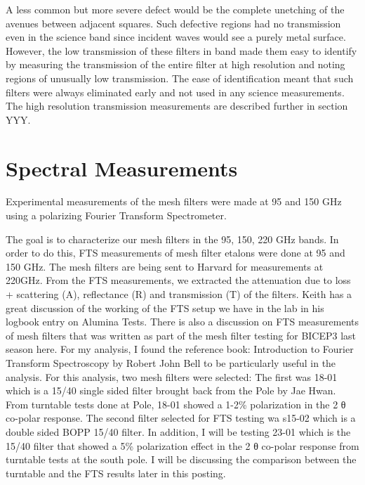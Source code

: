 \documentclass[12pt]{article}
\begin{document}
A less common but more severe defect would be the complete unetching of the avenues between adjacent squares. Such defective regions had no transmission even in the science band since incident waves would see a purely metal surface. However, the low transmission of these filters in band made them easy to identify by measuring the transmission of the entire filter at high resolution and noting regions of unusually low transmission. The ease of identification meant that such filters were always eliminated early and not used in any science measurements. The high resolution transmission measurements are described further in section YYY.


\section{Spectral Measurements}
Experimental measurements of the mesh filters were made at 95 and 150 GHz using a polarizing Fourier Transform Spectrometer. 

The goal is to characterize our mesh filters in the 95, 150, 220 GHz bands. In order to do this, FTS measurements of mesh filter etalons were done at 95 and 150 GHz. The mesh filters are being sent to Harvard for measurements at 220GHz. From the FTS measurements, we extracted the attenuation due to loss + scattering (A), reflectance (R) and transmission (T) of the filters. Keith has a great discussion of the working of the FTS setup we have in the lab in his logbook entry on Alumina Tests. There is also a discussion on FTS measurements of mesh filters that was written as part of the mesh filter testing for BICEP3 last season here. For my analysis, I found the reference book: Introduction to Fourier Transform Spectroscopy by Robert John Bell to be particularly useful in the analysis.
For this analysis, two mesh filters were selected: The first was 18-01 which is a 15/40 single sided filter brought back from the Pole by Jae Hwan. From turntable tests done at Pole, 18-01 showed a 1-2\% polarization in the 2 θ co-polar response. The second filter selected for FTS testing wa s15-02 which is a double sided BOPP 15/40 filter. In addition, I will be testing 23-01 which is the 15/40 filter that showed a 5\% polarization effect in the 2 θ co-polar response from turntable tests at the south pole. I will be discussing the comparison between the turntable and the FTS results later in this posting.
\end{document}
